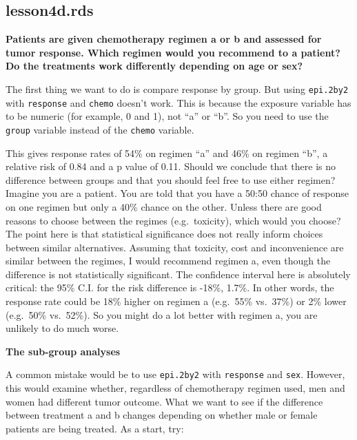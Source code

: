 \documentclass[]{book}
\newenvironment{Shaded}{\begin{snugshade}}{\end{snugshade}}
\newcommand{\CommentTok}[1]{\textcolor[rgb]{0.56,0.35,0.01}{\textit{#1}}}
\newcommand{\DecValTok}[1]{\textcolor[rgb]{0.00,0.00,0.81}{#1}}
\newcommand{\KeywordTok}[1]{\textcolor[rgb]{0.13,0.29,0.53}{\textbf{#1}}}
\newcommand{\NormalTok}[1]{#1}
\newcommand{\OperatorTok}[1]{\textcolor[rgb]{0.81,0.36,0.00}{\textbf{#1}}}
\newcommand{\StringTok}[1]{\textcolor[rgb]{0.31,0.60,0.02}{#1}}
\begin{document}
\hypertarget{lesson4d.rds}{%
\subsection{lesson4d.rds}\label{lesson4d.rds}}

\textbf{Patients are given chemotherapy regimen a or b and assessed for tumor response. Which regimen would you recommend to a patient? Do the treatments work differently depending on age or sex?}

The first thing we want to do is compare response by group. But using \texttt{epi.2by2} with \texttt{response} and \texttt{chemo} doesn't work. This is because the exposure variable has to be numeric (for example, 0 and 1), not ``a'' or ``b''. So you need to use the \texttt{group} variable instead of the \texttt{chemo} variable.

This gives response rates of 54\% on regimen ``a'' and 46\% on regimen ``b'', a relative risk of 0.84 and a p value of 0.11. Should we conclude that there is no difference between groups and that you should feel free to use either regimen? Imagine you are a patient. You are told that you have a 50:50 chance of response on one regimen but only a 40\% chance on the other. Unless there are good reasons to choose between the regimes (e.g.~toxicity), which would you choose? The point here is that statistical significance does not really inform choices between similar alternatives. Assuming that toxicity, cost and inconvenience are similar between the regimes, I would recommend regimen a, even though the difference is not statistically significant. The confidence interval here is absolutely critical: the 95\% C.I. for the risk difference is -18\%, 1.7\%. In other words, the response rate could be 18\% higher on regimen a (e.g.~55\% vs.~37\%) or 2\% lower (e.g.~50\% vs.~52\%). So you might do a lot better with regimen a, you are unlikely to do much worse.

\textbf{The sub-group analyses}

A common mistake would be to use \texttt{epi.2by2} with \texttt{response} and \texttt{sex}. However, this would examine whether, regardless of chemotherapy regimen used, men and women had different tumor outcome. What we want to see if the difference between treatment a and b changes depending on whether male or female patients are being treated. As a start, try:

\begin{Shaded}
\end{Shaded}
\end{document}
